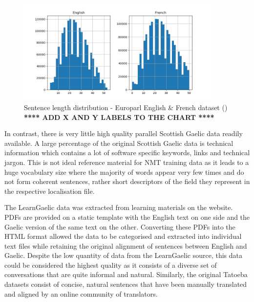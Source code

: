 \begin{figure}[ht!]
\centering
\includegraphics[width=0.9\textwidth]{media/methodology/sentence_length_french.png}
\captionsetup{justification=centering,font=Large}
\caption[Diagram of the Europarl dataset sentence length distribution]{Sentence length distribution - Europarl English \& French dataset (\cite{french_corpus_2005}) \\ \textbf{**** ADD X AND Y LABELS TO THE CHART ****}}
\label{fig:sentence_length-french_legal}
\end{figure}

In contrast, there is very little high quality parallel Scottish Gaelic data readily available. A large percentage of the original Scottish Gaelic data is technical information which contains a lot of software specific keywords, links and technical jargon. This is not ideal reference material for \acrshort{NMT} training data as it leads to a huge vocabulary size where the majority of words appear very few times and do not form coherent sentences, rather short descriptors of the field they represent in the respective localisation file. 

The LearnGaelic data was extracted from learning materials on the \cite{learn_gaelic_2019} website. PDFs are provided on a static template with the English text on one side and the Gaelic version of the same text on the other. Converting these PDFs into the HTML format allowed the data to be categorised and extracted into individual text files while retaining the original alignment of sentences between English and Gaelic.
Despite the low quantity of data from the LearnGaelic source, this data could be considered the highest quality as it consists of a diverse set of conversations that are quite informal and natural. Similarly, the original Tatoeba datasets consist of concise, natural sentences that have been manually translated and aligned by an online community of translators.

